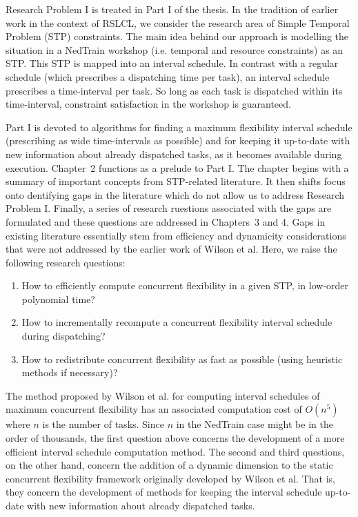 Research Problem I is treated in Part I of the thesis.
In the tradition of earlier work in the context of RSLCL, 
we consider the research area of Simple Temporal Problem (STP) constraints.
The main idea behind our approach is modelling the situation in a NedTrain workshop (i.e. temporal and resource constraints) as an STP.
This STP is mapped into an interval schedule.
In contrast with a regular schedule (which prescribes a dispatching time per task),
an interval schedule prescribes a time-interval per task. 
So long as each task is dispatched within its time-interval,
constraint satisfaction in the workshop is guaranteed.

Part I is devoted to algorithms for finding a maximum flexibility interval schedule (prescribing as wide time-intervals as possible)
and for keeping it up-to-date with new information about already dispatched tasks, as it becomes available during execution.
Chapter~2 functions as a prelude to Part I.
The chapter begins with a summary of important concepts from STP-related literature.
It then shifts focus onto dentifying gaps in the literature which do not allow us to address Research Problem I.
Finally, a series of research ruestions associated with the gaps are formulated and these questions are addressed in Chapters~3 and 4.
Gaps in existing literature essentially stem from efficiency and dynamicity 
considerations that were not addressed by the earlier work of Wilson et al.
Here, we raise the following research questions:
\begin{enumerate}
	\item How to efficiently compute concurrent flexibility in a given STP, in low-order polynomial time?	
	\item How to incrementally recompute a concurrent flexibility interval schedule during dispatching?
	\item How to redistribute concurrent flexibility as fast as possible (using heuristic methods if necessary)?
\end{enumerate}

The method proposed by Wilson et al. for computing interval schedules of maximum concurrent flexibility
has an associated computation cost of $O(n^5)$ where $n$ is the number of tasks.
Since $n$ in the NedTrain case might be in the order of thousands, 
the first question above concerns the development of a more efficient interval schedule computation method.
The second and third questions, on the other hand, concern the addition of a dynamic dimension 
to the static concurrent flexibility framework originally developed by Wilson et al.
That is, they concern the development of methods for keeping the interval schedule up-to-date
with new information about already dispatched tasks.

